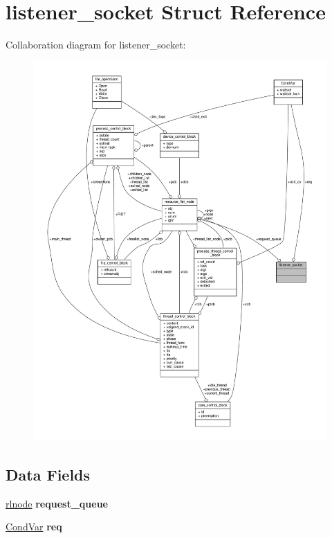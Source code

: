 \hypertarget{structlistener__socket}{}\section{listener\+\_\+socket Struct Reference}
\label{structlistener__socket}


Collaboration diagram for listener\+\_\+socket\+:
\nopagebreak
\begin{figure}[H]
\begin{center}
\leavevmode
\includegraphics[width=350pt]{structlistener__socket__coll__graph}
\end{center}
\end{figure}
\subsection*{Data Fields}
\begin{DoxyCompactItemize}
\item 
\mbox{\label{structlistener__socket_a94a7d9586a59f6b378250218e87b1fc2}} 
\hyperlink{group__rlists_ga8f6244877f7ce2322c90525217ea6e7a}{rlnode} {\bfseries request\+\_\+queue}
\item 
\mbox{\label{structlistener__socket_a143fd3d243217a6b09eb8254bb3dbdfd}} 
\hyperlink{structCondVar}{Cond\+Var} {\bfseries req}
\end{DoxyCompactItemize}


